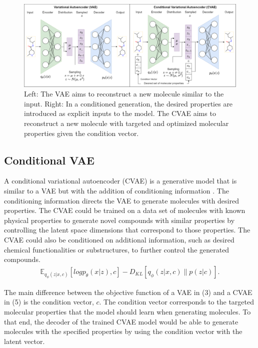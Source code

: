 \begin{figure}
    \centering
    \includegraphics[width=1\textwidth]{fig1.png}
    \caption{Left: The VAE aims to reconstruct a new molecule similar to the input. Right: In a conditioned generation, the desired properties are introduced as explicit inputs to the model. The CVAE aims to reconstruct a new molecule with targeted and optimized molecular properties given the condition vector.}
    \label{fig:img1}
\end{figure}


\subsection{Conditional VAE}
A conditional variational autoencoder (CVAE) is a generative model that is similar to a VAE but with the addition of conditioning information \cite{lim2018molecular}. The conditioning information directs the VAE to generate molecules with desired properties. The CVAE could be trained on a data set of molecules with known physical properties to generate novel compounds with similar properties by controlling the latent space dimensions that correspond to those properties. The CVAE could also be conditioned on additional information, such as desired chemical functionalities or substructures, to further control the generated compounds.
\begin{equation}
    \begin{split}
        \mathbb{E}_{q_\phi(z|x,c)}[log p_\theta(x|z),c] - D_{KL}[q_\phi(z|x,c)\parallel p(z|c)]. \label{eq}
    \end{split}
\end{equation}

The main difference between the objective function of a VAE in (3) and a CVAE in (5) is the condition vector, $c$. The condition vector corresponds to the targeted molecular properties that the model should learn when generating molecules. To that end, the decoder of the trained CVAE model would be able to generate molecules with the specified properties by using the condition vector with the latent vector\cite{lee2022mgcvae}.

